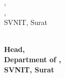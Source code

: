 {\begin{minipage}{0.49\textwidth}
{        \InternalSupervisorPosition{},\\
        \InternalSupervisorDept{},\\
        SVNIT, Surat\\
        }       
    \end{minipage}\begin{minipage}{0.49\textwidth}
        \begin{flushright}
            \textbf{\Hod{}\\
            Head,\\
            Department of \Subject{},\\
            SVNIT, Surat\\
            }
        \end{flushright}
    \end{minipage}
}
\newpage